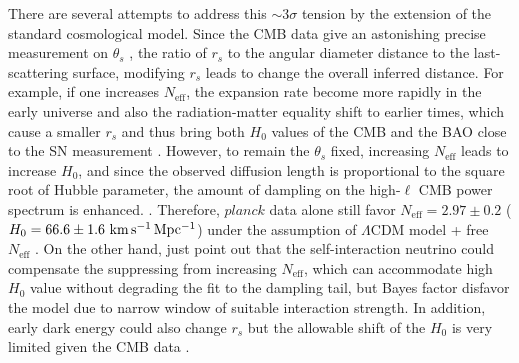 \documentclass[useAMS,usenatbib]{mnras}
\def\planck{\textit{planck}}
\def\kmsmpc{\rm km\,s^{-1}\,Mpc^{-1}}
\begin{document}
There are several attempts to address this $\sim 3\sigma$ tension by the extension of the standard cosmological model. 
Since the CMB data give an astonishing precise measurement on $\theta_{s}$ \citep[$\sim 0.05\%$;][]{planck18parameter}, the ratio of $r_{s}$ to the angular diameter distance to the last-scattering surface, modifying $r_{s}$ leads to change the overall inferred distance. 
For example, if one increases $N_{\textrm{eff}}$, the expansion rate become more rapidly in the early universe and also the radiation-matter equality shift to earlier times, which cause a smaller $r_{s}$ and thus bring both $H_{0}$ values of the CMB and the BAO close to the SN measurement \citep[e.g.,][]{HouEtal14,HeavensEtal14,WymanEtal14,CuestaEtal15}.
However, to remain the $\theta_{s}$ fixed, increasing $N_{\textrm{eff}}$ leads to increase $H_{0}$, and since the observed diffusion length is proportional to the square root of Hubble parameter, the amount of dampling on the high-$\ell$ CMB power spectrum is enhanced. %
\citep[e.g.,][]{Silk68,HouEtal13,planck16a}. Therefore, $\planck$ data alone still favor $N_{\textrm{eff}}= 2.97\pm0.2$ ($H_{0}=66.6\pm1.6~\kmsmpc$) under the assumption of $\Lambda$CDM model + free $N_{\textrm{eff}}$ \citep{AlamEtal17}. On the other hand, \citet{KreischEtal19} just point out that the self-interaction neutrino could compensate the suppressing from increasing $N_{\textrm{eff}}$, which can accommodate high $H_{0}$ value without degrading the fit to the dampling tail, but Bayes factor disfavor the model due to narrow window of suitable interaction strength. In addition, early dark energy could also change $r_{s}$ but the allowable shift of the $H_{0}$ is very limited given the CMB data \citep{PoulinEtal18}. %

\end{document}
